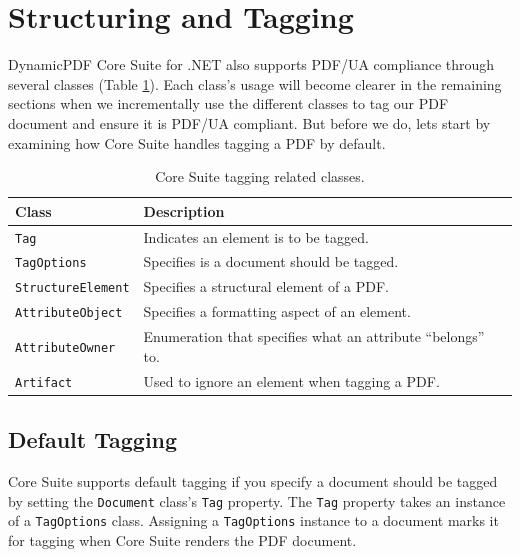 \documentclass[american,letterpaper]{tufte-book}
\providecommand{\tabularnewline}{\\}
\numberwithin{equation}{section}
\numberwithin{figure}{section}
\begin{document}
{{\begin{marginfigure}
\end{marginfigure}


\section{Structuring and Tagging}

DynamicPDF Core Suite for .NET also supports PDF/UA compliance
through several classes (Table \ref{tab:Core-Suite-tagging}). Each
class's usage will become clearer in the remaining sections when we
incrementally use the different classes to tag our PDF document and
ensure it is PDF/UA compliant. But before we do, lets start by examining
how Core Suite handles tagging a PDF by default.

\begin{table}
\begin{tabular}{ll}
\toprule 
{\footnotesize Class} & {\footnotesize Description}\tabularnewline
\midrule
{\footnotesize\texttt{Tag}} & {\footnotesize Indicates an element is to be tagged.}\tabularnewline
{\footnotesize\texttt{TagOptions}} & {\footnotesize Specifies is a document should be tagged.}\tabularnewline
{\footnotesize\texttt{StructureElement}} & {\footnotesize Specifies a structural element of a PDF.}\tabularnewline
{\footnotesize\texttt{AttributeObject}} & {\footnotesize Specifies a formatting aspect of an element.}\tabularnewline
{\footnotesize\texttt{AttributeOwner}} & {\footnotesize Enumeration that specifies what an attribute ``belongs''
to.}\tabularnewline
{\footnotesize\texttt{Artifact}} & {\footnotesize Used to ignore an element when tagging a PDF.}\tabularnewline
\bottomrule
\end{tabular}

\caption{Core Suite tagging related classes.}\label{tab:Core-Suite-tagging}

\end{table}


\subsection{Default Tagging}

Core Suite supports default tagging if you specify a document should
be tagged by setting the \texttt{Document} class's \texttt{Tag} property.
The \texttt{Tag} property takes an instance of a \texttt{TagOptions}
class. Assigning a \texttt{TagOptions} instance to a document marks
it for tagging when Core Suite renders the PDF document.

}}
\end{document}
